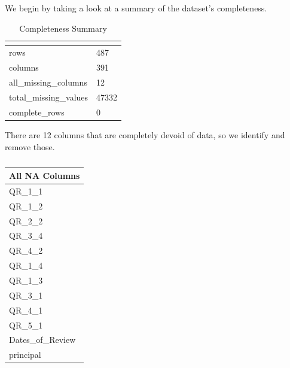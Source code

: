 \documentclass[
  man,floatsintext]{apa6}
\begin{document}
We begin by taking a look at a summary of the dataset's completeness.

\begin{table}[H]

\begin{center}
\begin{threeparttable}

\caption{\label{tab:data2}Completeness Summary}

\begin{tabular}{ll}
\toprule
 & \multicolumn{1}{c}{}\\
\midrule
rows & 487\\
columns & 391\\
all\_missing\_columns & 12\\
total\_missing\_values & 47332\\
complete\_rows & 0\\
\bottomrule
\end{tabular}

\end{threeparttable}
\end{center}

\end{table}

There are 12 columns that are completely devoid of data, so we identify and remove those.

\begin{table}[H]

\begin{center}
\begin{threeparttable}

\caption{\label{tab:unnamed-chunk-2}}

\begin{tabular}{l}
\toprule
All NA Columns\\
\midrule
QR\_1\_1\\
QR\_1\_2\\
QR\_2\_2\\
QR\_3\_4\\
QR\_4\_2\\
QR\_1\_4\\
QR\_1\_3\\
QR\_3\_1\\
QR\_4\_1\\
QR\_5\_1\\
Dates\_of\_Review\\
principal\\
\bottomrule
\end{tabular}

\end{threeparttable}
\end{center}

\end{table}
\end{document}
